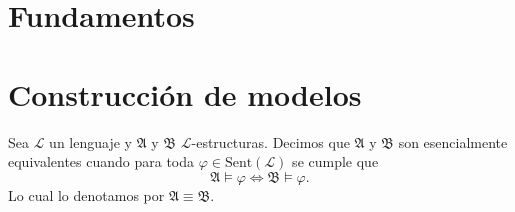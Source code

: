 


\usepackage{epigraph} 

\usepackage[scr=rsfs]{mathalpha}
\usepackage{proof}
\usepackage{amsmath,amssymb,amsthm,textcomp}
\newcommand{\Astruct}{\mathfrak{A}}
\newcommand{\Bstruct}{\mathfrak{B}}


\renewcommand*\contentsname{\'Indice}
\newcommand{\lang}{\mathcal{L}}

\newpage
\section{Fundamentos} 






\section{Construcci\'on de modelos}
\begin{definition}
  Sea $\lang$ un lenguaje y $\mathfrak{A}$ y $\mathfrak{B}$ $\lang$-estructuras. 
  Decimos que $\mathfrak{A}$ y $\mathfrak{B}$ son esencialmente equivalentes cuando para toda $\varphi \in \mathrm{Sent} (\lang)$ se cumple que 
  \[ \mathfrak{A} \models \varphi  \iff \mathfrak{B} \models \varphi. \]
  Lo cual lo denotamos por $\mathfrak{A} \equiv \mathfrak{B}$.
\end{definition}




